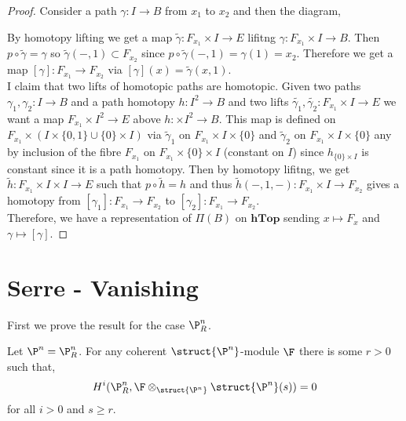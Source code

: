 \documentclass[12pt]{article}
\begin{document}
\begin{proof}
Consider a path $\gamma : I \to B$ from $x_1$ to $x_2$ and then the diagram,
\begin{center}
\end{center}
By homotopy lifting we get a map $\tilde{\gamma} : F_{x_1} \times I \to E$ lifitng $\gamma : F_{x_1} \times I \to B$. Then $p \circ \tilde{\gamma} = \gamma$ so $\tilde{\gamma}(-, 1) \subset F_{x_2}$ since $p \circ \tilde{\gamma}(-,1) = \gamma(1) = x_2$. Therefore we get a map $[\gamma] : F_{x_1} \to F_{x_2}$ via $[\gamma](x) = \tilde{\gamma}(x, 1)$. 
\bigskip\\
I claim that two lifts of homotopic paths are homotopic. Given two paths $\gamma_1, \gamma_2 : I \to B$ and a path homotopy $h : I^2 \to B$ and two lifts $\tilde{\gamma_1}, \tilde{\gamma_2} : F_{x_1} \times I \to E$ we want a map $F_{x_1} \times I^2 \to E$ above $h : \times I^2 \to B$. This map is defined on $F_{x_1} \times (I \times \{ 0, 1 \} \cup \{ 0 \} \times I)$ via $\tilde{\gamma}_1$ on $F_{x_1} \times I \times \{0\}$ and $\tilde{\gamma}_2$ on $F_{x_1} \times I \times \{0\}$ any by inclusion of the fibre $F_{x_1}$ on $F_{x_1} \times \{ 0 \} \times I$ (constant on $I$) since $h_ {\{0\} \times I}$ is constant since it is a path homotopy. Then by homotopy lifitng, we get $\tilde{h} : F_{x_1} \times I \times I \to E$ such that $p \circ \tilde{h} = h$ and thus $\tilde{h}(-, 1, -) : F_{x_1} \times I \to F_{x_2}$ gives a homotopy from $[\gamma_1] : F_{x_1} \to F_{x_2}$ to $[\gamma_2] : F_{x_1} \to F_{x_2}$. 
\bigskip\\
Therefore, we have a representation of $\Pi(B)$ on $\mathbf{hTop}$ sending $x \mapsto F_x$ and $\gamma \mapsto [\gamma]$. 
\end{proof}


\section{Serre - Vanishing}

\begin{rmk}
First we prove the result for the case $\P^n_R$. 
\end{rmk}

\begin{theorem}
Let $\P^n = \P^n_R$. For any coherent $\struct{\P^n}$-module $\F$ there is some $r > 0$ such that,
\[ H^i(\P^n_R, \F \otimes_{\struct{\P^n}} \struct{\P^n}(s)) = 0 \]
for all $i > 0$ and $s \ge r$.
\end{theorem}
\end{document}
